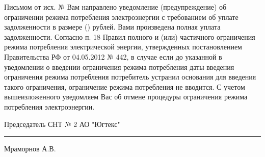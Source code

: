 Письмом от          исх. №     Вам    направлено уведомление (предупреждение) об  ограничении режима потребления электроэнергии с требованием об уплате задолженности в размере     ()       рублей.
  Вами произведена полная уплата задолженности.
Согласно п. 18 Правил полного и (или) частичного ограничения режима потребления электрической энергии, утвержденных постановлением Правительства РФ от 04.05.2012 № 442, в случае если до указанной в уведомлении о введении ограничения режима потребления даты введения ограничения режима потребления потребитель устранил основания для введения такого ограничения, ограничение режима потребления не вводится.
С учетом вышеизложенного уведомляем Вас об отмене процедуры ограничения режима потребления электроэнергии. 

\vspace{5mm}



\vspace{15mm}
\noindent Председатель СНТ № 2 АО "Югтекс" \hfill    \rule{3cm}{0.1 mm}    Мраморнов А.В.